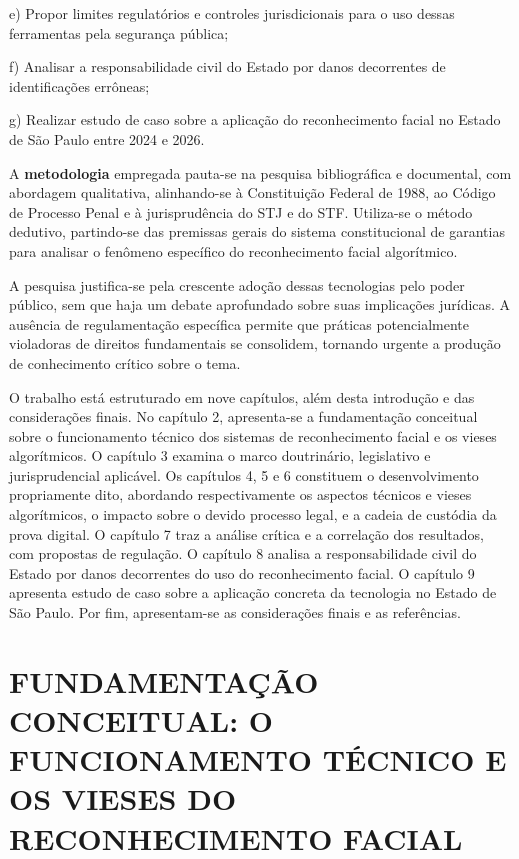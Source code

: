 \documentclass[12pt,a4paper]{article}
\begin{document}
e) Propor limites regulatórios e controles jurisdicionais para o uso dessas ferramentas pela segurança pública;

f) Analisar a responsabilidade civil do Estado por danos decorrentes de identificações errôneas;

g) Realizar estudo de caso sobre a aplicação do reconhecimento facial no Estado de São Paulo entre 2024 e 2026.

A \textbf{metodologia} empregada pauta-se na pesquisa bibliográfica e documental, com abordagem qualitativa, alinhando-se à Constituição Federal de 1988, ao Código de Processo Penal e à jurisprudência do STJ e do STF. Utiliza-se o método dedutivo, partindo-se das premissas gerais do sistema constitucional de garantias para analisar o fenômeno específico do reconhecimento facial algorítmico.

A pesquisa justifica-se pela crescente adoção dessas tecnologias pelo poder público, sem que haja um debate aprofundado sobre suas implicações jurídicas. A ausência de regulamentação específica permite que práticas potencialmente violadoras de direitos fundamentais se consolidem, tornando urgente a produção de conhecimento crítico sobre o tema.

O trabalho está estruturado em nove capítulos, além desta introdução e das considerações finais. No capítulo 2, apresenta-se a fundamentação conceitual sobre o funcionamento técnico dos sistemas de reconhecimento facial e os vieses algorítmicos. O capítulo 3 examina o marco doutrinário, legislativo e jurisprudencial aplicável. Os capítulos 4, 5 e 6 constituem o desenvolvimento propriamente dito, abordando respectivamente os aspectos técnicos e vieses algorítmicos, o impacto sobre o devido processo legal, e a cadeia de custódia da prova digital. O capítulo 7 traz a análise crítica e a correlação dos resultados, com propostas de regulação. O capítulo 8 analisa a responsabilidade civil do Estado por danos decorrentes do uso do reconhecimento facial. O capítulo 9 apresenta estudo de caso sobre a aplicação concreta da tecnologia no Estado de São Paulo. Por fim, apresentam-se as considerações finais e as referências.

\section{FUNDAMENTAÇÃO CONCEITUAL: O FUNCIONAMENTO TÉCNICO E OS VIESES DO RECONHECIMENTO FACIAL}
\end{document}
